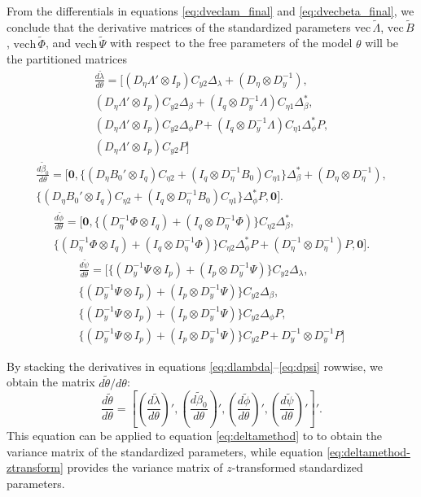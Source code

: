 \documentclass[a4paper,11pt]{article}
\newcommand{\n}{\eta}
\renewcommand{\l}{\lambda}
\renewcommand{\b}{\beta}
\newcommand{\p}{\phi}
\newcommand{\kronprod}{\otimes}
\renewcommand{\vec}{\mathrm{vec}\,}
\newcommand{\vech}{\mathrm{vech}\,}
\newcommand{\Lambdastan}{\tilde{\Lambda}}
\newcommand{\Bstan}{\tilde{B}}
\newcommand{\Phistan}{\tilde{\Phi}}
\newcommand{\Psistan}{\tilde{\Psi}}
\newcommand{\thetastan}{\tilde{\theta}}
\newcommand{\0}{\boldsymbol{0}}
\begin{document}
From the differentials in equations \ref{eq:dveclam_final} and
\ref{eq:dvecbeta_final},
we conclude that the derivative matrices  of the standardized parameters 
$\vec \Lambdastan$, $\vec \Bstan$, $\vech \Phistan$, and $\vech \Psistan$ with respect to the free 
parameters of the model $\theta$ will be the partitioned matrices
\begin{multline}\label{eq:dlambda}
\frac{d \tilde\l}{d \theta} = [
        (D_\n \Lambda' \kronprod I_p) C_{y2} \Delta_\l + 
            (D_\n \kronprod D_y^{-1}), \\
        (D_\n \Lambda' \kronprod I_p) C_{y2} \Delta_\b + 
            (I_q \kronprod D_y^{-1}\Lambda) C_{\n1} \Delta^*_\b,\\
(D_\n \Lambda' \kronprod I_p) C_{y2} \Delta_\p P +
         (I_q \kronprod D_y^{-1}\Lambda) C_{\n1} \Delta^*_\p P, \\            
        (D_\n \Lambda' \kronprod I_p) C_{y2}  P
 ] 
\end{multline}
\begin{multline}\label{eq:dbeta}
\frac{d \tilde\b_0}{d \theta} = [
        \0,
         \{(D_\n B_0' \kronprod I_q) C_{\n2}  + 
            (I_q \kronprod D_\n^{-1}B_0) C_{\n1} \} \Delta^*_\b +
            (D_\n \kronprod D_\n^{-1})
            ,\\
         \{(D_\n B_0' \kronprod I_q) C_{\n2}  + 
            (I_q \kronprod D_\n^{-1}B_0) C_{\n1} \} \Delta^*_\p P
            ,  
        \0
 ] .
\end{multline}
\begin{multline}\label{eq:dphi}
\frac{d \tilde{\phi}}{d \theta} = [
\0,
      \{ (D^{-1}_\n \Phi \kronprod I_q)  + (I_q \kronprod D_\n^{-1}\Phi)  \} C_{\n2} \Delta^*_\b        
     ,\\
      \{(D^{-1}_\n \Phi \kronprod I_q)  + (I_q \kronprod D_\n^{-1}\Phi)  \}  C_{\n2} \Delta^*_\p  P +   
      	 (D_\n^{-1} \kronprod D_\n^{-1}) P
              ,
        \0
 ] .
\end{multline}
\newcommand{\F}{\{(D^{-1}_y \Psi \kronprod I_p)  + (I_p \kronprod D_y^{-1}\Psi)  \}  C_{y2}}
\begin{multline}\label{eq:dpsi}
\frac{d \tilde{\psi}}{d \theta} = [
\F   \Delta_\l  ,\\
\F   \Delta_\b         ,\\
\F   \Delta_\p   P       ,\\
 \F P  + D^{-1}_y \kronprod D^{-1}_y P
   ]
\end{multline}

By stacking the derivatives in equations \ref{eq:dlambda}--\ref{eq:dpsi} rowwise, we obtain the matrix $d \thetastan / d \theta$:
\begin{equation}\label{eq:dthetatilde}
\frac{d \thetastan}{d \theta} = [
\left( \frac{d \tilde\l}{d \theta} \right)',
\left( \frac{d \tilde\b_0}{d \theta} \right)',
\left( \frac{d \tilde{\phi}}{d \theta} \right)',
\left( \frac{d \tilde{\psi}}{d \theta}\right)'
]'.
\end{equation}
This equation can be applied to equation \ref{eq:deltamethod} to 
to obtain the variance matrix of the standardized parameters, while equation \ref{eq:deltamethod-ztransform}
provides the variance matrix of $z$-transformed standardized parameters.
\end{document}
